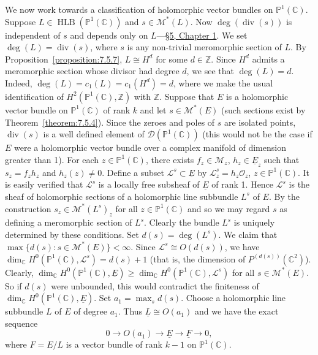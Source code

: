 We now work towards a classification of holomorphic vector bundles on $\mathbb{P}^1(\mathbb{C})$. Suppose $L\in\operatorname{HLB}(\mathbb{P}^1(\mathbb{C}))$ and $s\in \mathcal{M}^*(L)$. Now $\deg(\operatorname{div}(s))$ is independent of $s$ and depends only on $L$---\hyperref[sec:1:5]{\S5, Chapter 1}. We set $\deg(L)=\operatorname{div}(s)$, where $s$ is any non-trivial meromorphic section of $L$. By Proposition~\ref{proposition:7.5.7}, $L\cong H^d$ for some $d\in\mathbb{Z}$. Since $H^d$ admits a meromorphic section whose divisor had degree $d$, we see
that $\deg(L)=d$. Indeed, $\deg(L)=c_1(L)=c_1(H^d)=d$, where we make the usual identification of $H^2(\mathbb{P}^1(\mathbb{C}),\mathbb{Z})$ with $\mathbb{Z}$. Suppose that $E$ is a holomorphic vector bundle on $\mathbb{P}^1(\mathbb{C})$ of rank $k$ and let $s\in \mathcal{M}^*(E)$ (such sections exist by Theorem~\ref{theorem:7.5.4}). Since the zeroes and poles of $s$ are isolated points, $\operatorname{div}(s)$ is a well defined element of $\mathcal{D}(\mathbb{P}^1(\mathbb{C}))$ (this would not be the case if $E$ were a holomorphic vector bundle over a complex manifold of dimension greater than 1). For each $z\in\mathbb{P}^1(\mathbb{C})$, there exists $f_z\in\mathcal{M}_z$, $h_z\in\underline{E}_z$ such that $s_z=f_zh_z$ and $h_z(z)\ne0$. Define a subset $\mathcal{L}^s\subset\underline{E}$ by $\mathcal{L}^s_z=h_z\mathcal{O}_z$, $z\in\mathbb{P}^1(\mathbb{C})$. It is easily verified that $\mathcal{L}^s$ is a locally free subsheaf of $\underline{E}$ of rank 1. Hence $\mathcal{L}^s$ is the sheaf of holomorphic sections of a holomorphic line subbundle $L^s$ of $E$. By the construction $s_z\in\mathcal{M}^*(L^s)_z$ for all $z\in\mathbb{P}^1(\mathbb{C})$ and so we may regard $s$ as defining a meromorphic section of $L^s$. Clearly the bundle $L^s$ is uniquely determined by these conditions. Set $d(s)=\deg(L^s)$. We claim that $\max\{d(s):s\in \mathcal{M}^*(E)\}<\infty$. Since $\mathcal{L}^s\cong O(d(s))$, we have $\dim_{\mathbb{C}}H^0(\mathbb{P}^1(\mathbb{C}),\mathcal{L}^s)=d(s)+1$ (that is, the dimension of $P^{(d(s))}(\mathbb{C}^2)$). Clearly, $\dim_{\mathbb{C}}H^0(\mathbb{P}^1(\mathbb{C}),\underline{E})\geq\dim_{\mathbb{C}}H^0(\mathbb{P}^1(\mathbb{C}),\mathcal{L}^s)$ for all $s\in \mathcal{M}^*(E)$. So if $d(s)$ were unbounded, this would contradict the finiteness of $\dim_{\mathbb{C}}H^0(\mathbb{P}^1(\mathbb{C}),\underline{E})$. Set $a_1=\max_s d(s)$. Choose a holomorphic line subbundle $L$ of $E$ of degree $a_1$. Thus $\underline{L}\cong O(a_1)$ and we have the exact sequence
\[
0\to O(a_1)\to\underline{E}\to\underline{F}\to0,
\]
where $F=E/L$ is a vector bundle of rank $k-1$ on $\mathbb{P}^1(\mathbb{C})$.

